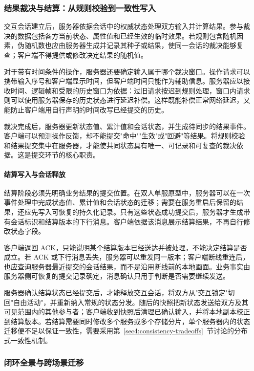 \subsubsection{结果裁决与结算：从规则校验到一致性写入}\label{sec2:battle-arbitration}

交互会话建立后，服务器依据会话中的权威状态处理双方输入并计算结果。参与裁决的数据包括各方当前状态、属性值和已经生效的临时效果。若规则包含随机因素，伪随机数也应由服务器生成并记录其种子或结果，使同一会话的裁决能够复查；客户端不得提供或修改决定结果的随机值。

对于带有时间条件的操作，服务器还要确定输入属于哪个裁决窗口。操作请求可以携带输入序号和客户端显示时间，但客户端时间只能作为辅助信息。服务器应以接收时间、逻辑帧和受限的历史窗口为依据：过旧请求按迟到规则处理，窗口内请求则可以使用服务器保存的历史状态进行延迟补偿。这样既能补偿正常网络延迟，又能防止客户端用自行声明的时间改写已经提交的历史。

裁决完成后，服务器更新状态值、累计值和会话状态，并生成待同步的结果事件。客户端可以预测操作反馈，却不能提交"命中""生效"或"回避"等结果。将规则校验和结果提交集中在服务器，才能使共同状态具有唯一、可记录和可复查的裁决依据。这是提交环节的核心职责。

\paragraph{结算写入与会话释放}\label{sec2:battle-commit}

结算阶段必须先明确业务结果的提交位置。在双人单服原型中，服务器可以在一次事件处理中完成状态值、累计值和会话状态的迁移；需要在服务重启后保留的结果，还应先写入可恢复的持久化记录。只有这些状态成功提交后，服务器才生成带有会话标识和结算版本的下行消息。客户端依据该消息展示结算结果，不再自行修改状态字段。

客户端返回 ACK，只能说明某个结算版本已经送达并被处理，不能决定结算是否成立。若 ACK 或下行消息丢失，服务器可以重发同一版本；客户端断线重连后，也应查询服务器最近提交的会话结果，而不是沿用断线前的本地画面。业务事实由服务器侧可恢复的提交记录确定，消息确认只用于判断是否需要继续发送。

服务器确认结算状态已经提交后，才能释放交互会话，将双方从"交互锁定"切回"自由活动"，并重新纳入常规的状态分发。随后的快照把新状态发送给双方及其可见范围内的其他参与者；客户端收到快照后清理已确认输入，并将本地副本校正到结算版本。若结算需要同时修改多个服务或多个存储分片，单个服务器内的状态迁移便不足以保证一致性，需要采用第~\ref{sec4:consistency-tradeoffs}~节讨论的分布式一致性机制。

\subsubsection{闭环全景与跨场景迁移}\label{sec2:game-to-system}

